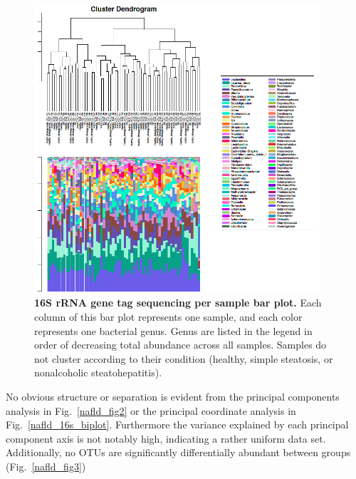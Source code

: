\begin{figure}[h]
\begin{center}
\includegraphics[width=0.95\textwidth]{16s_genus_barplot.png}
\caption{\textbf{16S rRNA gene tag sequencing per sample bar plot.} Each column of this bar plot represents one sample, and each color represents one bacterial genus. Genus are listed in the legend in order of decreasing total abundance across all samples. Samples do not cluster according to their condition (healthy, simple steatosis, or nonalcoholic steatohepatitis).}
\end{center}
\label{nafld_16s_barplot}
\end{figure}

No obvious structure or separation is evident from the principal components analysis in Fig.~\ref{nafld_fig2} or the principal coordinate analysis in Fig.~\ref{nafld_16s_biplot}. Furthermore the variance explained by each principal component axis is not notably high, indicating a rather uniform data set. Additionally, no OTUs are significantly differentially abundant between groups (Fig.~\ref{nafld_fig3})

